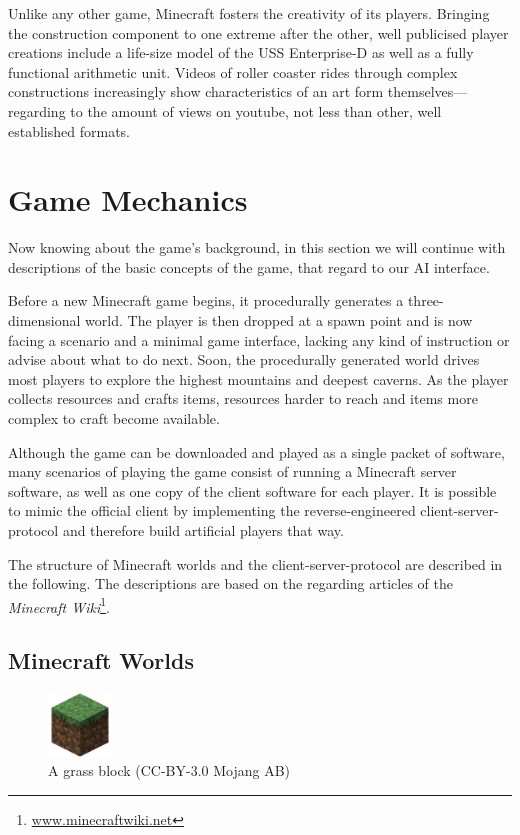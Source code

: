 Unlike any other game, Minecraft fosters the creativity of its players. Bringing the construction component to one extreme after the other, well publicised player creations include a life-size model of the USS Enterprise-D as well as a fully functional arithmetic unit. Videos of roller coaster rides through complex constructions increasingly show characteristics of an art form themselves---regarding to the amount of views on youtube, not less than other, well established formats.

    \section{Game Mechanics}
Now knowing about the game's background, in this section we will continue with descriptions of the basic concepts of the game, that regard to our AI interface. 

Before a new Minecraft game begins, it procedurally generates a three-dimensional world. The player is then dropped at a spawn point and is now facing a scenario and a minimal game interface, lacking any kind of instruction or advise about what to do next. Soon, the procedurally generated world drives most players to explore the highest mountains and deepest caverns. As the player collects resources and crafts items, resources harder to reach and items more complex to craft become available.~\cite{Duncan:2011:MBC:2207096.2207097}

Although the game can be downloaded and played as a single packet of software, many scenarios of playing the game consist of running a Minecraft server software, as well as one copy of the client software for each player. It is possible to mimic the official client by implementing the reverse-engineered client-server-protocol and therefore build artificial players that way.

The structure of Minecraft worlds and the client-server-protocol are described in the following. The descriptions are based on the regarding articles of the \emph{Minecraft Wiki}\footnote{\url{www.minecraftwiki.net}}.

    \subsection{Minecraft Worlds}
    
\begin{figure}
  \begin{center}
    \includegraphics[width=0.15\textwidth]{graphics/block}
  \end{center}
  \caption{A grass block (CC-BY-3.0 Mojang AB) \cite{image_mob}}
  \label{mc_block}
\end{figure}

